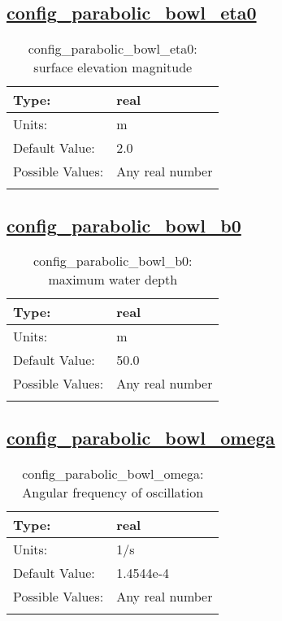 \subsection[config\_parabolic\_bowl\_eta0]{\hyperref[sec:nm_tab_parabolic_bowl]{config\_parabolic\_bowl\_eta0}}
\label{subsec:nm_sec_config_parabolic_bowl_eta0}
\begin{center}
\begin{longtable}{| p{2.0in} || p{4.0in} |}
    \hline
    Type: & real \\
    \hline
    Units: & \si{m} \\
    \hline
    Default Value: & 2.0 \\
    \hline
    Possible Values: & Any real number \\
    \hline
    \caption{config\_parabolic\_bowl\_eta0: surface elevation magnitude}
\end{longtable}
\end{center}
\subsection[config\_parabolic\_bowl\_b0]{\hyperref[sec:nm_tab_parabolic_bowl]{config\_parabolic\_bowl\_b0}}
\label{subsec:nm_sec_config_parabolic_bowl_b0}
\begin{center}
\begin{longtable}{| p{2.0in} || p{4.0in} |}
    \hline
    Type: & real \\
    \hline
    Units: & \si{m} \\
    \hline
    Default Value: & 50.0 \\
    \hline
    Possible Values: & Any real number \\
    \hline
    \caption{config\_parabolic\_bowl\_b0: maximum water depth}
\end{longtable}
\end{center}
\subsection[config\_parabolic\_bowl\_omega]{\hyperref[sec:nm_tab_parabolic_bowl]{config\_parabolic\_bowl\_omega}}
\label{subsec:nm_sec_config_parabolic_bowl_omega}
\begin{center}
\begin{longtable}{| p{2.0in} || p{4.0in} |}
    \hline
    Type: & real \\
    \hline
    Units: & \si{1/s} \\
    \hline
    Default Value: & 1.4544e-4 \\
    \hline
    Possible Values: & Any real number \\
    \hline
    \caption{config\_parabolic\_bowl\_omega: Angular frequency of oscillation}
\end{longtable}
\end{center}
